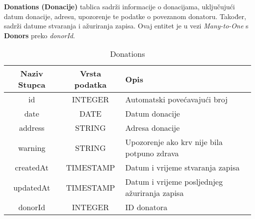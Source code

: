 				\noindent\textbf{Donations (Donacije)} tablica sadrži informacije o donacijama, uključujući datum donacije, adresu, upozorenje te podatke o povezanom donatoru. Također, sadrži datume stvaranja i ažuriranja zapisa. Ovaj entitet je u vezi \textit{Many-to-One} s \textbf{Donors} preko \textit{donorId}.
				\begin{table}[H]
				    \renewcommand{\arraystretch}{2}
				    \centering
				     \begin{tabularx}{1\textwidth}{|c|c|X|}
				    \hline
				    \textbf{Naziv Stupca} & \textbf{Vrsta podatka} & \textbf{Opis} \\
				    \hline
				    \cellcolor{LightGreen}id & INTEGER & Automatski povećavajući broj\\
				    \hline
				    date & DATE & Datum donacije \\
				    \hline
				    address & STRING & Adresa donacije \\
				    \hline
				    warning & STRING & Upozorenje ako krv nije bila potpuno zdrava \\
				    \hline
				    createdAt & TIMESTAMP & Datum i vrijeme stvaranja zapisa \\
				    \hline
				    updatedAt & TIMESTAMP & Datum i vrijeme posljednjeg ažuriranja zapisa \\
				    \hline
				    \cellcolor{LightBlue} donorId & INTEGER & ID donatora  \\
				    \hline
				    \end{tabularx}
				    \caption{Donations}
				    \label{tab:my_label}
				\end{table}
				\clearpage %
				
